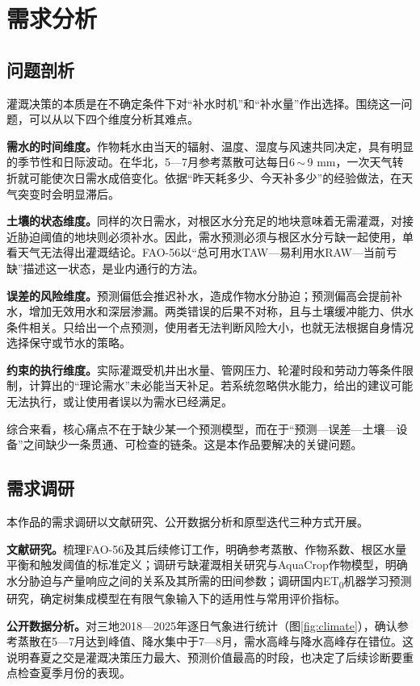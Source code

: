 \section{需求分析}
\subsection{问题剖析}
灌溉决策的本质是在不确定条件下对“补水时机”和“补水量”作出选择。围绕这一问题，可以从以下四个维度分析其难点。

\textbf{需水的时间维度。}作物耗水由当天的辐射、温度、湿度与风速共同决定，具有明显的季节性和日际波动。在华北，5—7月参考蒸散可达每日6\,$\sim$\,9 mm，一次天气转折就可能使次日需水成倍变化。依据“昨天耗多少、今天补多少”的经验做法，在天气突变时会明显滞后。

\textbf{土壤的状态维度。}同样的次日需水，对根区水分充足的地块意味着无需灌溉，对接近胁迫阈值的地块则必须补水。因此，需水预测必须与根区水分亏缺一起使用，单看天气无法得出灌溉结论。FAO-56以“总可用水TAW—易利用水RAW—当前亏缺”描述这一状态，是业内通行的方法\cite{fao}。

\textbf{误差的风险维度。}预测偏低会推迟补水，造成作物水分胁迫；预测偏高会提前补水，增加无效用水和深层渗漏。两类错误的后果不对称，且与土壤缓冲能力、供水条件相关。只给出一个点预测，使用者无法判断风险大小，也就无法根据自身情况选择保守或节水的策略。

\textbf{约束的执行维度。}实际灌溉受机井出水量、管网压力、轮灌时段和劳动力等条件限制，计算出的“理论需水”未必能当天补足。若系统忽略供水能力，给出的建议可能无法执行，或让使用者误以为需水已经满足。

综合来看，核心痛点不在于缺少某一个预测模型，而在于“预测—误差—土壤—设备”之间缺少一条贯通、可检查的链条。这是本作品要解决的关键问题。

\subsection{需求调研}
本作品的需求调研以文献研究、公开数据分析和原型迭代三种方式开展。

\textbf{文献研究。}梳理FAO-56及其后续修订工作\cite{fao,pereira}，明确参考蒸散、作物系数、根区水量平衡和触发阈值的标准定义；调研亏缺灌溉相关研究\cite{fereres}与AquaCrop作物模型\cite{aquacrop}，明确水分胁迫与产量响应之间的关系及其所需的田间参数；调研国内ET\textsubscript{0}机器学习预测研究\cite{fan,feng}，确定树集成模型在有限气象输入下的适用性与常用评价指标。

\textbf{公开数据分析。}对三地2018—2025年逐日气象进行统计（图\ref{fig:climate}），确认参考蒸散在5—7月达到峰值、降水集中于7—8月，需水高峰与降水高峰存在错位。这说明春夏之交是灌溉决策压力最大、预测价值最高的时段，也决定了后续诊断要重点检查夏季月份的表现。

